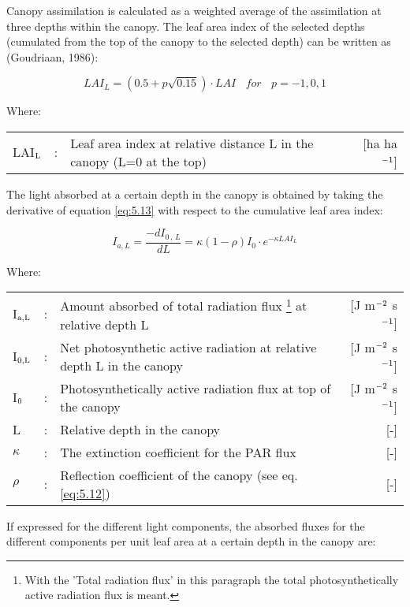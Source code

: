 Canopy assimilation is calculated as a weighted average of the assimilation at three
depths within the canopy. The leaf area index of the selected depths (cumulated from the top of the
canopy to the selected depth) can be written as (Goudriaan, 1986):

\begin{equation}
\label{eq:LAI_reldepth}
LAI_{L} = (0.5 + p \sqrt{0.15}) \cdot LAI~~~~for~~~~p = -1,0,1
\end{equation}


Where:\\[5pt]
\begin{tabularx}{\textwidth}{llXr}
	LAI$_{{\rm L}}$ &:& Leaf area index at relative distance L in the canopy 
	(L=0 at the top)    &    [ha ha$^{{\rm -1}}$]\\
\end{tabularx}

The light absorbed at a certain depth in the canopy is obtained by taking the derivative of
equation \ref{eq:5.13} with respect to the cumulative leaf area index:

\begin{equation}
I_{a,L} = {\frac{-dI _{0\, ,\, L} }{dL}} = \kappa (1 -  \rho) I_{0} \cdot e^{- \kappa LAI_{L}}
\end{equation}

Where:\\[5pt]
\begin{tabularx}{\textwidth}{llXr}
	I$_{{\rm a,L}}$ &:& Amount absorbed of total radiation flux
	\footnote{With the 'Total radiation flux' in this paragraph the total photosynthetically 
		active radiation flux is meant.} at relative depth L    &    
	[J m$^{{\rm -2}}$ s$^{{\rm -1}}$]\\
	I$_{{\rm 0,L}}$ &:& Net photosynthetic active radiation at relative depth L in 
	the canopy    &    [J m$^{{\rm -2}}$ s$^{{\rm -1}}$]\\
	I$_{{\rm 0}}$ &:& Photosynthetically active radiation flux at top of the 
	canopy   &     [J m$^{{\rm -2}}$ s$^{{\rm -1}}$]\\
	L &:& Relative depth in the canopy   &     [-]\\
	$\kappa$ &:& The extinction coefficient for the PAR flux    &     [-]\\
	$\rho$ &:& Reflection coefficient of the canopy (see eq. \ref{eq:5.12})   &     [-]\\
\end{tabularx}

If expressed for the different light components, the absorbed fluxes for the different
components per unit leaf area at a certain depth in the canopy are:

